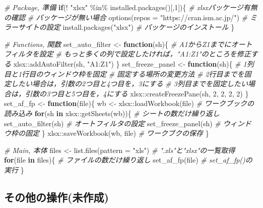 \documentclass[
]{article}
\newenvironment{Shaded}{\begin{snugshade}}{\end{snugshade}}
\newcommand{\AttributeTok}[1]{\textcolor[rgb]{0.77,0.63,0.00}{#1}}
\newcommand{\CommentTok}[1]{\textcolor[rgb]{0.56,0.35,0.01}{\textit{#1}}}
\newcommand{\ControlFlowTok}[1]{\textcolor[rgb]{0.13,0.29,0.53}{\textbf{#1}}}
\newcommand{\DecValTok}[1]{\textcolor[rgb]{0.00,0.00,0.81}{#1}}
\newcommand{\FunctionTok}[1]{\textcolor[rgb]{0.00,0.00,0.00}{#1}}
\newcommand{\NormalTok}[1]{#1}
\newcommand{\OtherTok}[1]{\textcolor[rgb]{0.56,0.35,0.01}{#1}}
\newcommand{\SpecialCharTok}[1]{\textcolor[rgb]{0.00,0.00,0.00}{#1}}
\newcommand{\StringTok}[1]{\textcolor[rgb]{0.31,0.60,0.02}{#1}}
\begin{document}
\begin{Shaded}
\begin{Highlighting}[]
  \CommentTok{\# Package, 準備}
\ControlFlowTok{if}\NormalTok{(}\SpecialCharTok{!} \StringTok{"xlsx"} \SpecialCharTok{\%in\%} \FunctionTok{installed.packages}\NormalTok{()[,}\DecValTok{1}\NormalTok{])\{  }\CommentTok{\# xlsxパッケージ有無の確認}
  \CommentTok{\# パッケージが無い場合}
  \FunctionTok{options}\NormalTok{(}\AttributeTok{repos =} \StringTok{"https://cran.ism.ac.jp/"}\NormalTok{) }\CommentTok{\# ミラーサイトの設定}
  \FunctionTok{install.packages}\NormalTok{(}\StringTok{"xlsx"}\NormalTok{)                   }\CommentTok{\# パッケージのインストール}
\NormalTok{\}}

  \CommentTok{\# Functions, 関数}
\NormalTok{set\_auto\_filter }\OtherTok{\textless{}{-}} \ControlFlowTok{function}\NormalTok{(sh)\{}
  \CommentTok{\# A1からZ1までにオートフィルタを設定}
  \CommentTok{\#   もっと多くの列で設定したければ，"A1:Z1"のところを修正する}
\NormalTok{  xlsx}\SpecialCharTok{::}\FunctionTok{addAutoFilter}\NormalTok{(sh, }\StringTok{"A1:Z1"}\NormalTok{)}
\NormalTok{\}}
\NormalTok{set\_freeze\_panel }\OtherTok{\textless{}{-}} \ControlFlowTok{function}\NormalTok{(sh)\{}
  \CommentTok{\# 1列目と1行目のウィンドウ枠を固定}
  \CommentTok{\#   固定する場所の変更方法}
  \CommentTok{\#     2行目までを固定したい場合は，引数の2つ目と4つ目を，3にする}
  \CommentTok{\#     3列目までを固定したい場合は，引数の3つ目と5つ目を，4にする}
\NormalTok{  xlsx}\SpecialCharTok{::}\FunctionTok{createFreezePane}\NormalTok{(sh, }\DecValTok{2}\NormalTok{, }\DecValTok{2}\NormalTok{, }\DecValTok{2}\NormalTok{, }\DecValTok{2}\NormalTok{)}
\NormalTok{\}}
\NormalTok{set\_af\_fp }\OtherTok{\textless{}{-}} \ControlFlowTok{function}\NormalTok{(file)\{}
\NormalTok{  wb }\OtherTok{\textless{}{-}}\NormalTok{ xlsx}\SpecialCharTok{::}\FunctionTok{loadWorkbook}\NormalTok{(file)   }\CommentTok{\# ワークブックの読み込み}
  \ControlFlowTok{for}\NormalTok{(sh }\ControlFlowTok{in}\NormalTok{ xlsx}\SpecialCharTok{::}\FunctionTok{getSheets}\NormalTok{(wb))\{  }\CommentTok{\# シートの数だけ繰り返し}
    \FunctionTok{set\_auto\_filter}\NormalTok{(sh)            }\CommentTok{\#   オートフィルタの設定}
    \FunctionTok{set\_freeze\_panel}\NormalTok{(sh)           }\CommentTok{\#   ウィンドウ枠の固定}
\NormalTok{  \}}
\NormalTok{  xlsx}\SpecialCharTok{::}\FunctionTok{saveWorkbook}\NormalTok{(wb, file)     }\CommentTok{\# ワークブクの保存}
\NormalTok{\}}

  \CommentTok{\# Main, 本体}
\NormalTok{files }\OtherTok{\textless{}{-}} \FunctionTok{list.files}\NormalTok{(}\AttributeTok{pattern =} \StringTok{"xls"}\NormalTok{) }\CommentTok{\# ".xls"と"xlsx"の一覧取得}
\ControlFlowTok{for}\NormalTok{(file }\ControlFlowTok{in}\NormalTok{ files)\{                  }\CommentTok{\# ファイルの数だけ繰り返し}
  \FunctionTok{set\_af\_fp}\NormalTok{(file)                    }\CommentTok{\# set\_af\_fp()の実行}
\NormalTok{\}}
\end{Highlighting}
\end{Shaded}

\hypertarget{ux305dux306eux4ed6ux306eux64cdux4f5cux672aux4f5cux6210}{%
\subsection{その他の操作(未作成)}\label{ux305dux306eux4ed6ux306eux64cdux4f5cux672aux4f5cux6210}}
\end{document}
